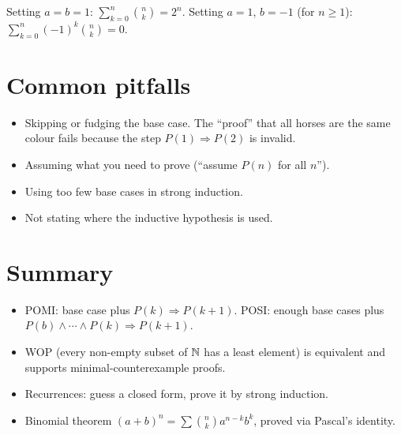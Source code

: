 \begin{example}
Setting $a = b = 1$: $\sum_{k=0}^n \binom nk = 2^n$. Setting $a = 1$, $b = -1$ (for $n\geq 1$):
$\sum_{k=0}^n (-1)^k\binom nk = 0$.
\end{example}

\section{Common pitfalls}
\begin{itemize}
  \item Skipping or fudging the base case. The ``proof'' that all horses are the same colour
        fails because the step $P(1) \Rightarrow P(2)$ is invalid.
  \item Assuming what you need to prove (``assume $P(n)$ for all $n$'').
  \item Using too few base cases in strong induction.
  \item Not stating where the inductive hypothesis is used.
\end{itemize}

\section{Summary}
\begin{itemize}
  \item POMI: base case plus $P(k) \Rightarrow P(k+1)$. POSI: enough base cases plus
        $P(b)\wedge\cdots\wedge P(k) \Rightarrow P(k+1)$.
  \item WOP (every non-empty subset of $\mathbb{N}$ has a least element) is equivalent and supports
        minimal-counterexample proofs.
  \item Recurrences: guess a closed form, prove it by strong induction.
  \item Binomial theorem $(a+b)^n = \sum \binom nk a^{n-k}b^k$, proved via Pascal's identity.
\end{itemize}
